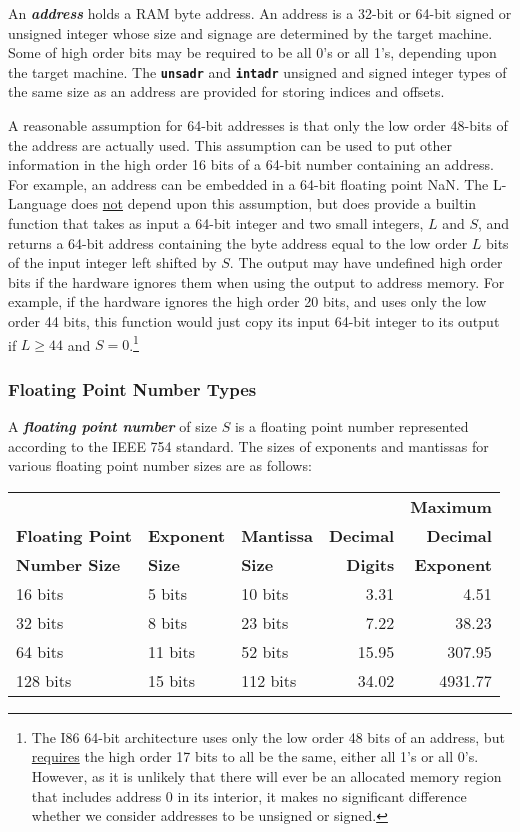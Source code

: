 \documentclass[12pt]{article}
\newcommand{\TT}[1]{{\tt \bfseries #1}}
\newcommand{\key}[1]{{\bf \em #1}\index{#1}}
\begin{document}
An \key{address} holds a RAM byte address.
An address is a 32-bit or 64-bit signed or unsigned integer whose size
and signage are determined by the target machine.
Some of high order bits may be
required to be all 0's or all 1's, depending upon
the target machine.  The \TT{unsadr} and \TT{intadr}
unsigned and signed integer types of the same size
as an address are provided for storing indices and offsets.

A reasonable assumption for 64-bit addresses is that only the low
order 48-bits of the address are actually used.  This assumption can
be used to put other information in the high order 16 bits
of a 64-bit number containing an address.  For example, an address
can be embedded in a 64-bit floating point NaN.  The L-Language does
\underline{not} depend upon this assumption, but does provide a builtin function
that takes as input a 64-bit integer and two small integers, $L$ and $S$,
and returns a 64-bit address containing
the byte address equal to the low order $L$ bits of the input integer
left shifted by $S$.  The output may have undefined high order bits if
the hardware ignores them when using the output to address memory.
For example, if the hardware ignores the high order 20 bits, and uses only the
low order 44 bits,
this function would just copy its input 64-bit integer to its output
if $L\geq 44$ and $S=0$.\footnote{The I86 64-bit architecture
uses only the low order 48 bits of an address, but \underline{requires}
the high order 17 bits to all be the same, either all 1's or all 0's.
However, as it is unlikely that there will ever be an allocated memory region
that includes address 0 in its interior, it makes no significant difference
whether we consider addresses to be unsigned or signed.}

\subsubsection{Floating Point Number Types}

A \key{floating point number} of size $S$ is a floating point number
represented according to the IEEE 754 standard.  The sizes of exponents
and mantissas for various floating point number sizes are as follows:

\begin{center}
\begin{tabular}{l@{~~~~~~}l@{~~~~~~}l@{~~~~~~}r@{~~~~~~}r}
                   &              &              &             & \bf Maximum \\
\bf Floating Point & \bf Exponent & \bf Mantissa & \bf Decimal & \bf Decimal\\
\bf Number Size    & \bf Size     & \bf Size     & \bf Digits  & \bf Exponent
\\[2ex]
16 bits & 5 bits & 10 bits & 3.31 & 4.51 \\
32 bits & 8 bits & 23 bits & 7.22 & 38.23 \\
64 bits & 11 bits & 52 bits & 15.95 & 307.95 \\
128 bits & 15 bits & 112 bits & 34.02 & 4931.77 \\
\end{tabular}
\end{center}
\end{document}
